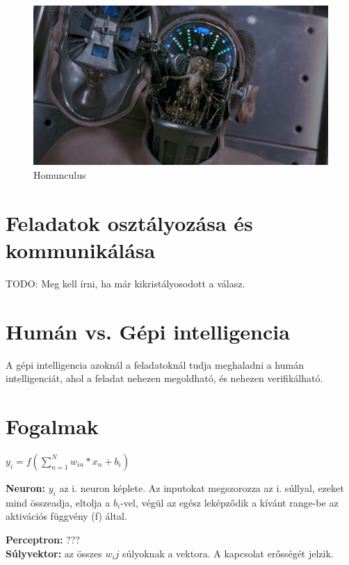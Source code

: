 \documentclass{article}
\begin{document}
\begin{figure}[h!]
\centering
\includegraphics[width=\textwidth,height=\textheight,keepaspectratio]{homunculus.png}
\caption{Homunculus}
\label{fig:homunculus}
\end{figure}

\section{Feladatok osztályozása és kommunikálása}

TODO: Meg kell írni, ha már kikristályosodott a válasz.

\section{Humán vs. Gépi intelligencia}
A gépi intelligencia azoknál a feladatoknál tudja meghaladni a humán intelligenciát, ahol a feladat nehezen megoldható, és nehezen verifikálható.

\section{Fogalmak}
$y_i = f(\sum_{n=1}^N w_{in}*x_n + b_i)$ \newline

\textbf{Neuron:} $y_i$ az i. neuron képlete. Az inputokat megszorozza az i. súllyal, ezeket mind összeadja, eltolja a $b_i$-vel, végül az egész leképződik a kívánt range-be az aktivációs függvény (f) által. \newline

\textbf{Perceptron:} ???\\

\textbf{Súlyvektor:} az összes $w_ij$ súlyoknak a vektora. A kapcsolat erősségét jelzik.\\
\end{document}

